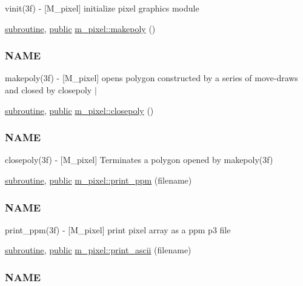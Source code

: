\begin{DoxyCompactItemize}
\begin{DoxyCompactList}
vinit(3f) -\/ \mbox{[}M\+\_\+pixel\mbox{]} initialize pixel graphics module \end{DoxyCompactList}\item 
\hyperlink{M__stopwatch_83_8txt_acfbcff50169d691ff02d4a123ed70482}{subroutine}, \hyperlink{M__stopwatch_83_8txt_a2f74811300c361e53b430611a7d1769f}{public} \hyperlink{namespacem__pixel_ab7128437f95b40004bf73fc6e3f597f8}{m\+\_\+pixel\+::makepoly} ()
\begin{DoxyCompactList}\small\item\em \subsubsection*{N\+A\+ME}

makepoly(3f) -\/ \mbox{[}M\+\_\+pixel\mbox{]} opens polygon constructed by a series of move-\/draws and closed by closepoly $\vert$ \end{DoxyCompactList}\item 
\hyperlink{M__stopwatch_83_8txt_acfbcff50169d691ff02d4a123ed70482}{subroutine}, \hyperlink{M__stopwatch_83_8txt_a2f74811300c361e53b430611a7d1769f}{public} \hyperlink{namespacem__pixel_ab3dc83b63d2ab1bf3f63932abca4245d}{m\+\_\+pixel\+::closepoly} ()
\begin{DoxyCompactList}\small\item\em \subsubsection*{N\+A\+ME}

closepoly(3f) -\/ \mbox{[}M\+\_\+pixel\mbox{]} Terminates a polygon opened by makepoly(3f) \end{DoxyCompactList}\item 
\hyperlink{M__stopwatch_83_8txt_acfbcff50169d691ff02d4a123ed70482}{subroutine}, \hyperlink{M__stopwatch_83_8txt_a2f74811300c361e53b430611a7d1769f}{public} \hyperlink{namespacem__pixel_a01797b04ce7c693c3fd6a841e8d1de48}{m\+\_\+pixel\+::print\+\_\+ppm} (filename)
\begin{DoxyCompactList}\small\item\em \subsubsection*{N\+A\+ME}

print\+\_\+ppm(3f) -\/ \mbox{[}M\+\_\+pixel\mbox{]} print pixel array as a ppm p3 file \end{DoxyCompactList}\item 
\hyperlink{M__stopwatch_83_8txt_acfbcff50169d691ff02d4a123ed70482}{subroutine}, \hyperlink{M__stopwatch_83_8txt_a2f74811300c361e53b430611a7d1769f}{public} \hyperlink{namespacem__pixel_ab2bb47aea567667b1b92c8265bcb36fb}{m\+\_\+pixel\+::print\+\_\+ascii} (filename)
\begin{DoxyCompactList}\small\item\em \subsubsection*{N\+A\+ME}


\end{DoxyCompactList}
\end{DoxyCompactItemize}
